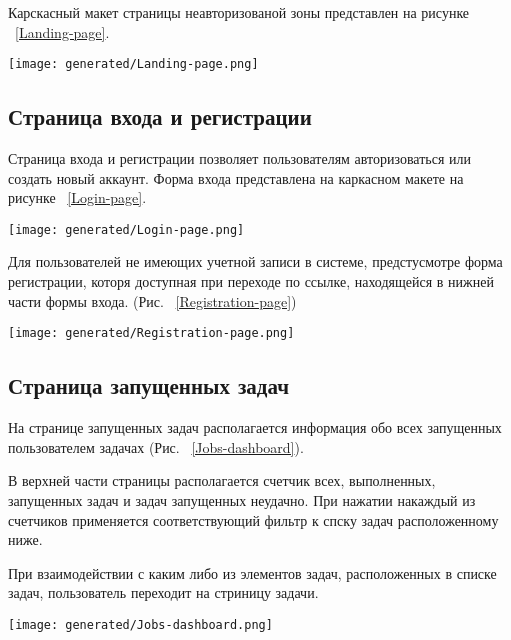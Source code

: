 Карскасный макет страницы неавторизованой зоны представлен на рисунке ~\ref{Landing-page}.

\begin{figure*}[!t]
  \centering
  \texttt{[image: generated/Landing-page.png]}
  \caption{Каркасный макет страницы неавторизованой зоны}
  \label{Landing-page}
\end{figure*}

\subsection{Страница входа и регистрации}

Страница входа и регистрации позволяет пользователям авторизоваться или создать новый аккаунт. Форма входа представлена на каркасном макете на рисунке ~\ref{Login-page}.

\begin{figure*}[!t]
  \centering
  \texttt{[image: generated/Login-page.png]}
  \caption{Каркасный макет страницы входа}
  \label{Login-page}
\end{figure*}

Для пользователей не имеющих учетной записи в системе, предстусмотре форма регистрации, которя доступная при переходе по ссылке, находящейся в нижней части формы входа. (Рис. ~\ref{Registration-page})

\begin{figure*}[!t]
  \centering
  \texttt{[image: generated/Registration-page.png]}
  \caption{Каркасный макет страницы регистрации пользователя}
  \label{Registration-page}
\end{figure*}

\subsection{Страница запущенных задач}

На странице запущенных задач располагается информация обо всех запущенных пользователем задачах (Рис. ~\ref{Jobs-dashboard}).

В верхней части страницы располагается счетчик всех, выполненных, запущенных задач и задач запущенных неудачно.
При нажатии накаждый из счетчиков применяется соответствующий фильтр к спску задач расположенному ниже.

При взаимодействии с каким либо из элементов задач, расположенных в списке задач, пользователь переходит на стриницу задачи.

\begin{figure*}[!t]
  \centering
  \texttt{[image: generated/Jobs-dashboard.png]}
  \caption{Каркасный макет страницы запущенных задач}
  \label{Jobs-dashboard}
\end{figure*}

